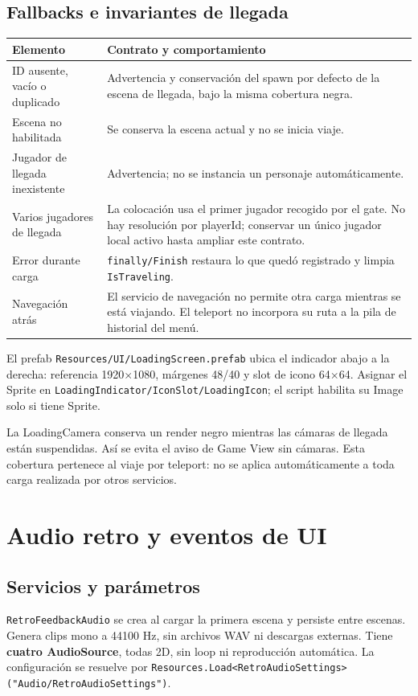 \documentclass[11pt,letterpaper,oneside]{article}
\makeatletter
\newcommand{\code}[1]{\nolinkurl{#1}}
\newenvironment{spec}{\begingroup\small\begin{longtable}{@{}>{\raggedright\arraybackslash}p{0.32\textwidth}>{\raggedright\arraybackslash}p{0.64\textwidth}@{}}\toprule\textbf{Elemento} & \textbf{Contrato y comportamiento} \\ \midrule\endhead}{\bottomrule\end{longtable}\endgroup}
\makeatother
\begin{document}
\subsection{Fallbacks e invariantes de llegada}
\begin{spec}
ID ausente, vacío o duplicado & Advertencia y conservación del spawn por defecto de la escena de llegada, bajo la misma cobertura negra. \\
Escena no habilitada & Se conserva la escena actual y no se inicia viaje. \\
Jugador de llegada inexistente & Advertencia; no se instancia un personaje automáticamente. \\
Varios jugadores de llegada & La colocación usa el primer jugador recogido por el gate. No hay resolución por playerId; conservar un único jugador local activo hasta ampliar este contrato. \\
Error durante carga & \code{finally/Finish} restaura lo que quedó registrado y limpia \code{IsTraveling}. \\
Navegación atrás & El servicio de navegación no permite otra carga mientras se está viajando. El teleport no incorpora su ruta a la pila de historial del menú. \\
\end{spec}
El prefab \code{Resources/UI/LoadingScreen.prefab} ubica el indicador abajo a la derecha: referencia 1920\(\times\)1080, márgenes 48/40 y slot de icono 64\(\times\)64. Asignar el Sprite en \code{LoadingIndicator/IconSlot/LoadingIcon}; el script habilita su Image solo si tiene Sprite.

La LoadingCamera conserva un render negro mientras las cámaras de llegada están suspendidas. Así se evita el aviso de Game View sin cámaras. Esta cobertura pertenece al viaje por teleport: no se aplica automáticamente a toda carga realizada por otros servicios.

\section{Audio retro y eventos de UI}
\subsection{Servicios y parámetros}
\code{RetroFeedbackAudio} se crea al cargar la primera escena y persiste entre escenas. Genera clips mono a 44100 Hz, sin archivos WAV ni descargas externas. Tiene \textbf{cuatro AudioSource}, todas 2D, sin loop ni reproducción automática. La configuración se resuelve por \code{Resources.Load<RetroAudioSettings>("Audio/RetroAudioSettings")}.
\end{document}
